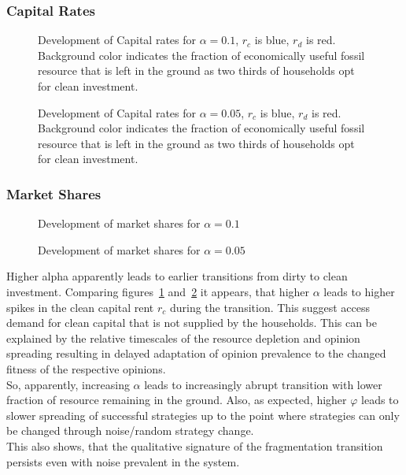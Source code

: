\subsubsection{Capital Rates}
\begin{figure}[t]
	\centering
	\caption{Development of Capital rates for $\alpha=0.1$, $r_c$ is blue, $r_d$ is red. Background color indicates the fraction of economically useful fossil resource that is left in the ground as two thirds of households opt for clean investment.}
	\label{5o2_3}
\end{figure}

\begin{figure}[t]
	\centering
	\caption{Development of Capital rates for $\alpha=0.05$, $r_c$ is blue, $r_d$ is red. Background color indicates the fraction of economically useful fossil resource that is left in the ground as two thirds of households opt for clean investment.}
	\label{5o2_4}
\end{figure}
\subsubsection{Market Shares}
\begin{figure}[t]
	\centering
	\caption{Development of market shares for $\alpha=0.1$}

\end{figure}

\begin{figure}[t]
	\centering
	\caption{Development of market shares for $\alpha=0.05$}

\end{figure}
Higher alpha apparently leads to earlier transitions from dirty to clean investment.
Comparing figures~\ref{5o2_3} and~\ref{5o2_4} it appears, that higher $\alpha$ leads to higher spikes in the clean capital rent $r_c$ during the transition. This suggest access demand for clean capital that is not supplied by the households. This can be explained by the relative timescales of the resource depletion and opinion spreading resulting in delayed adaptation of opinion prevalence to the changed fitness of the respective opinions.\\
So, apparently, increasing $\alpha$ leads to increasingly abrupt transition with lower fraction of resource remaining in the ground. Also, as expected, higher $\varphi$ leads to slower spreading of successful strategies up to the point where strategies can only be changed through noise/random strategy change. \\
This also shows, that the qualitative signature of the fragmentation transition persists even with noise prevalent in the system.

